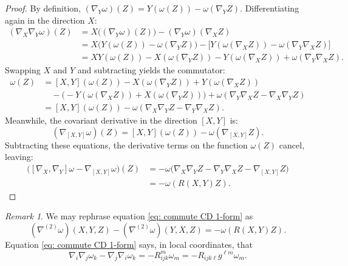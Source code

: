 \documentclass[11pt]{article}
\theoremstyle{plain}
\theoremstyle{definition}
\theoremstyle{remark}
\newtheorem{remark}[theorem]{Remark}
\begin{document}
\begin{proof}
    By definition, $(\nabla_Y \omega)(Z) = Y(\omega(Z)) - \omega(\nabla_Y Z)$. Differentiating again in the direction $X$:
    \begin{align*}
        (\nabla_X \nabla_Y \omega)(Z) &= X \big( (\nabla_Y \omega)(Z) \big) - (\nabla_Y \omega)(\nabla_X Z) \\
        &= X \big( Y(\omega(Z)) - \omega(\nabla_Y Z) \big) - \big[ Y(\omega(\nabla_X Z)) - \omega(\nabla_Y \nabla_X Z) \big] \\
        &= XY(\omega(Z)) - X(\omega(\nabla_Y Z)) - Y(\omega(\nabla_X Z)) + \omega(\nabla_Y \nabla_X Z).
    \end{align*}
    Swapping $X$ and $Y$ and subtracting yields the commutator:
    \begin{align*}
        [\nabla_X, \nabla_Y]\omega(Z) &= [X,Y](\omega(Z)) - X(\omega(\nabla_Y Z)) + Y(\omega(\nabla_X Z)) \\
        &\quad - \big( -Y(\omega(\nabla_X Z)) + X(\omega(\nabla_Y Z)) \big) + \omega(\nabla_Y \nabla_X Z - \nabla_X \nabla_Y Z) \\
        &= [X,Y](\omega(Z)) - \omega(\nabla_X \nabla_Y Z - \nabla_Y \nabla_X Z).
    \end{align*}
    Meanwhile, the covariant derivative in the direction $[X,Y]$ is:
    \begin{equation*}
        (\nabla_{[X,Y]} \omega)(Z) = [X,Y](\omega(Z)) - \omega(\nabla_{[X,Y]} Z).
    \end{equation*}
    Subtracting these equations, the derivative terms on the function $\omega(Z)$ cancel, leaving:
    \begin{align*}
        \big([\nabla_X, \nabla_Y] \omega - \nabla_{[X,Y]} \omega\big)(Z) &= - \omega\big( \nabla_X \nabla_Y Z - \nabla_Y \nabla_X Z - \nabla_{[X,Y]} Z \big) \\
        &= -\omega(R(X,Y)Z).
    \end{align*}
\end{proof}

\begin{remark}
We may rephrase equation \eqref{eq: commute CD 1-form} as
\begin{equation}
    (\nabla^{(2)} \omega)(X, Y, Z)
- (\nabla^{(2)} \omega)(Y, X, Z) = - \omega(R(X,Y)Z).
\end{equation}
Equation \eqref{eq: commute CD 1-form} says, in local coordinates, that
\begin{equation}\label{eq: commute CD 1-form coord}
    \nabla_i \nabla_j \omega_k - \nabla_j \nabla_i \omega_k = - R_{ijk}^m \omega_m = - R_{ijk\ell}g^{\ell m} \omega_m . 
\end{equation}
\end{remark}
\end{document}
